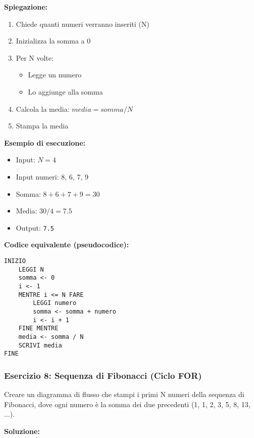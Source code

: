 \documentclass[a4paper,16pt]{article}
\begin{document}
\textbf{Spiegazione:}
\begin{enumerate}
    \item Chiede quanti numeri verranno inseriti (N)
    \item Inizializza la somma a 0
    \item Per N volte:
    \begin{itemize}
        \item Legge un numero
        \item Lo aggiunge alla somma
    \end{itemize}
    \item Calcola la media: $media = somma / N$
    \item Stampa la media
\end{enumerate}

\textbf{Esempio di esecuzione:}
\begin{itemize}
    \item Input: $N = 4$
    \item Input numeri: 8, 6, 7, 9
    \item Somma: $8 + 6 + 7 + 9 = 30$
    \item Media: $30 / 4 = 7.5$
    \item Output: \texttt{7.5}
\end{itemize}

\textbf{Codice equivalente (pseudocodice):}
\begin{lstlisting}
INIZIO
    LEGGI N
    somma <- 0
    i <- 1
    MENTRE i <= N FARE
        LEGGI numero
        somma <- somma + numero
        i <- i + 1
    FINE MENTRE
    media <- somma / N
    SCRIVI media
FINE
\end{lstlisting}

\newpage
\subsubsection{Esercizio 8: Sequenza di Fibonacci (Ciclo FOR)}

\begin{tcolorbox}[colback=blue!5!white,colframe=blue!75!black,title=Traccia]
Creare un diagramma di flusso che stampi i primi N numeri della sequenza di Fibonacci, dove ogni numero è la somma dei due precedenti (1, 1, 2, 3, 5, 8, 13, ...).
\end{tcolorbox}

\textbf{Soluzione:}
\end{document}

